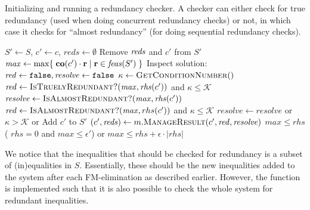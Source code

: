 \begin{algorithm}[htbp]
\caption{Initializing and running a redundancy checker. A checker can either check for true redundancy (used when doing concurrent redundancy checks) or not, in which case it checks for ``almost redundancy'' (for doing sequential redundancy checks).}\label{alg:checker}
\begin{algorithmic}[1]
	\State $S'\gets S$, $c'\gets c$, $\mathit{reds}\gets \emptyset$
		\State Remove $\mathit{reds}$ and $c'$ from $S'$
		\State $\mathit{max} \gets \max\{\;{\mathbf{co}(c')\cdot\mathbf{r}}\;|\;{\mathbf{r}\in \mathit{feas}(S')}\;\}$
		\State Inspect solution:
		\Indent
			\State $\mathit{red}\gets \texttt{false}, \mathit{resolve}\gets \texttt{false}$
			\State $\kappa\gets \Call{GetConditionNumber}{\null}$
				\State $\mi{red} \gets \Call{IsTruelyRedundant?}{\mathit{max}, \rhs(c')}$ and $\kappa\leq \mathcal{K}$
				\State $\mathit{resolve} \gets \Call{IsAlmostRedundant?}{\mathit{max}, \rhs(c')}$
			\Else
				\State$\mi{red} \gets \Call{IsAlmostRedundant?}{\mathit{max}, rhs(c')}$ and $\kappa\leq\mathcal{K}$
			\EndIf
			\State $\mathit{resolve} \gets \mathit{resolve}$ or $\kappa>\mathcal{K}$ or 
		\EndIndent
			\State Add $c'$ to $S'$
		\EndIf
		\State $(c', \mi{reds})\gets m.\Call{ManageResult}{c', \mathit{red}, \mathit{resolve}}$
	\EndWhile
	\State\Return
\EndFunction
\Statex
{}
	\State\Return $\mathit{max} \leq \mathit{rhs}$
\EndFunction
\Statex
{}
		\State\Return ( $\mathit{rhs} = 0$ and $\mathit{max} \leq \epsilon'$) or 
				$\mathit{max} \leq \mathit{rhs} + \epsilon\cdot |\mathit{rhs}|$
\EndFunction
\end{algorithmic}
\end{algorithm}

We notice that the inequalities that should be checked for redundancy is a subset of (in)equalities in $S$. Essentially, these should be the new inequalities added to the system after each FM-elimination as described earlier. However, the function is implemented such that it is also possible to check the whole system for redundant inequalities.

